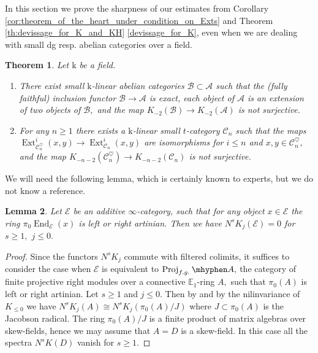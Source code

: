 \documentclass[11pt,leqno]{amsart}
\newtheorem{theo}{Theorem}[section]
\newtheorem{lemma}[theo]{Lemma}
\numberwithin{equation}{section}
\def\End{\operatorname{End}}
\newcommand{\hy}{\mhyphen}
\newcommand{\Proj}{\operatorname{Proj}}
\newcommand{\bE}{{\mathbb E}}
\newcommand{\mk}{\mathrm k}
\newcommand{\cA}{{\mathcal A}}
\newcommand{\cB}{{\mathcal B}}
\newcommand{\cC}{{\mathcal C}}
\newcommand{\cE}{{\mathcal E}}
\newcommand{\Ext}{\operatorname{Ext}}
\begin{document}
In this section we prove the sharpness of our estimates from Corollary \ref{cor:theorem_of_the_heart_under_condition_on_Exts} and Theorem \ref{th:devissage_for_K_and_KH} \ref{devissage_for_K}, even when we are dealing with small dg resp. abelian categories over a field.

\begin{theo}\label{th:sharpness_of_estimates} Let $\mk$ be a field.
\begin{enumerate}[label=(\roman*),ref=(\roman*)]
\item  There exist small $\mk$-linear abelian categories $\cB\subset \cA$ such that the (fully faithful) inclusion functor $\cB\to\cA$ is exact, each object of $\cA$ is an extension of two objects of $\cB,$ and the map $K_{-2}(\cB)\to K_{-2}(\cA)$ is not surjective. \label{sharp_for_devissage}
\item For any $n\geq 1$ there exists a $\mk$-linear small $t$-category $\cC_n$ such that the maps $\Ext_{\cC_n^{\heartsuit}}^i(x,y)\to\Ext_{\cC_n}^i(x,y)$ are isomorphisms for $i\leq n$ and $x,y\in\cC_n^{\heartsuit},$ and the map $K_{-n-2}(\cC_n^{\heartsuit})\to K_{-n-2}(\cC_n)$ is not surjective. \label{sharp_for_th_of_the_heart}
\end{enumerate}
\end{theo}

We will need the following lemma, which is certainly known to experts, but we do not know a reference.

\begin{lemma}\label{lem:non_positive_nil_groups_for_artinian}
Let $\cE$ be an additive $\infty$-category, such that for any object $x\in\cE$ the ring $\pi_0\End_{\cE}(x)$ is left or right artinian. Then we have $N^s K_j(\cE)=0$ for $s\geq 1,$ $j\leq 0.$
\end{lemma} 

\begin{proof}
Since the functors $N^s K_j$ commute with filtered colimits, it suffices to consider the case when $\cE$ is equivalent to $\Proj_{f.g.}\hy A,$ the category of finite projective right modules over a connective $\bE_1$-ring $A,$ such that $\pi_0(A)$ is left or right artinian. Let $s\geq 1$ and $j\leq 0.$ Then by \cite[Theorem 9.53]{BGT} and by the nilinvariance of $K_{\leq 0}$ we have $N^s K_j(A)\cong N^s K_j(\pi_0(A)/J)$ where $J\subset \pi_0(A)$ is the Jacobson radical. The ring $\pi_0(A)/J$ is a finite product of matrix algebras over skew-fields, hence we may assume that $A = D$ is a skew-field. In this case all the spectra $N^s K(D)$ vanish for $s\geq 1.$ 
\end{proof}
\end{document}
